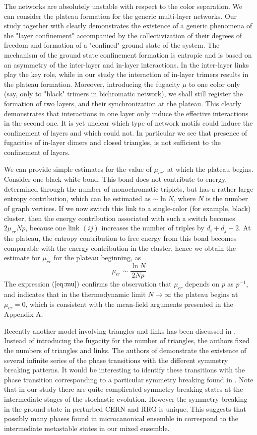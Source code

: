\documentclass[aps,12pt]{revtex4}
\newcommand{\eq}[1]{(\ref{#1})}
\newcommand{\be}{\begin{equation}}
\newcommand{\ee}{\end{equation}}
\begin{document}
The networks are absolutely unstable with respect to the color separation. We can consider the plateau formation for the generic multi-layer networks. Our study together with \cite{arenas2} clearly demonstrates the existence of a generic phenomena of the "layer confinement" accompanied by the collectivization of their degrees of freedom and formation of a "confined" ground state of the system. The mechanism of the ground state confinement formation is entropic and is based on an asymmetry of the inter-layer and in-layer interactions. In \cite{arenas2} the inter-layer links play the key role, while in our study the interaction of in-layer trimers results in the plateau formation. Moreover, introducing the fugacity $\mu$ to one color only (say, only to "black" trimers in bichromatic network), we shall still register the formation of two layers, and their synchronization at the plateau. This clearly demonstrates that interactions in one layer only induce the effective interactions in the second one. It is yet unclear which type of network motifs could induce the confinement of layers and which could not. In particular we see that presence of fugacities of in-layer dimers and closed triangles, is not sufficient to the confinement of layers.

We can provide simple estimates for the value of $\mu_{cr}$, at which the plateau begins. Consider one black-white bond. This bond does not contribute to energy, determined through the number of monochromatic triplets, but has a rather large entropy contribution, which can be estimated as $\sim \ln N$, where $N$ is the number of graph vertices. If we now switch this link to a single-color (for example, black) cluster, then the energy contribution associated with such a switch becomes $2\mu_{cr} Np$, because one link $(ij)$ increases the number of triples by $d_i + d_j-2$. At the plateau, the entropy contribution to free energy from this bond becomes comparable with the energy contribution in the cluster, hence we obtain the estimate for $\mu_{cr}$ for the plateau beginning, as
\be
\mu_{cr}\sim \frac{\ln N}{2 Np}
\label{eq:mu}
\ee
The expression $\eq{eq:mu}$ confirms the observation that $\mu_{cr}$ depends on $p$ as $p^{-1}$, and indicates that in the thermodynamic limit $N\to\infty$ the plateau begins at $\mu_{cr}=0$, which is consistent with the mean-field arguments presented in the Appendix A.

Recently another model involving triangles and links has been discussed in \cite{radin}. Instead of introducing the fugacity for the number of triangles, the authors fixed the numbers of triangles and links. The authors of \cite{radin} demonstrate the existence of several infinite series of the phase transitions with the different symmetry breaking patterns. It would be interesting to identify these transitions with the phase transition corresponding to a particular symmetry breaking found in \cite{decay}. Note that in our study there are quite complicated symmetry breaking states at the intermediate stages of the stochastic evolution. However the symmetry breaking in the ground state in perturbed CERN and RRG is unique. This suggests that possibly many phases found in microcanonical ensemble in \cite{radin} correspond to the intermediate metastable states in our mixed ensemble.
\end{document}
